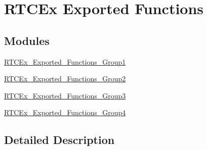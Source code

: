 \hypertarget{group___r_t_c_ex___exported___functions}{}\section{R\+T\+C\+Ex Exported Functions}
\label{group___r_t_c_ex___exported___functions}
\subsection*{Modules}
\begin{DoxyCompactItemize}
\item 
\hyperlink{group___r_t_c_ex___exported___functions___group1}{R\+T\+C\+Ex\+\_\+\+Exported\+\_\+\+Functions\+\_\+\+Group1}
\item 
\hyperlink{group___r_t_c_ex___exported___functions___group2}{R\+T\+C\+Ex\+\_\+\+Exported\+\_\+\+Functions\+\_\+\+Group2}
\item 
\hyperlink{group___r_t_c_ex___exported___functions___group3}{R\+T\+C\+Ex\+\_\+\+Exported\+\_\+\+Functions\+\_\+\+Group3}
\item 
\hyperlink{group___r_t_c_ex___exported___functions___group4}{R\+T\+C\+Ex\+\_\+\+Exported\+\_\+\+Functions\+\_\+\+Group4}
\end{DoxyCompactItemize}


\subsection{Detailed Description}
